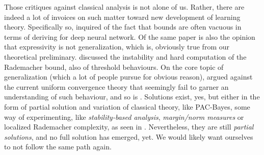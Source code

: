 \documentclass[10pt]{article} %
\begin{document}
Those critiques against classical analysis is not alone of us. Rather, there are indeed a lot of invoices on such matter toward new development of learning theory. Specifically so, \cite{zhang2017understandingdeeplearningrequires} inquired of the fact that bounds are often vacuous in terms of deriving for deep neural network. Of the same paper is also the opinion that expressivity is not generalization, which is, obviously true from our theoretical preliminary. \cite{truong2025rademachercomplexitybasedgeneralizationbounds} discussed the instability and hard computation of the Rademacher bound, also of threshold behaviours. On the core topic of generalization (which a lot of people pursue for obvious reason), \cite{nagarajan2021uniformconvergenceunableexplain} argued against the current uniform convergence theory that seemingly fail to garner an understanding of such behaviour, and so is \cite{tunali2019empirical}. Solutions exist, yes, but either in the form of partial solution and variation of classical theory, like PAC-Bayes, some way of experimenting, like \textit{stability-based analysis}, \textit{margin/norm measures} or localized Rademacher complexity, as seen in \cite{bartlett2005local,bartlett2017spectrally,bousquet2002stability,neyshabur2015norm}. Nevertheless, they are still \textit{partial solutions}, and no full solution has emerged, yet. We would likely want ourselves to not follow the same path again. 
\end{document}
